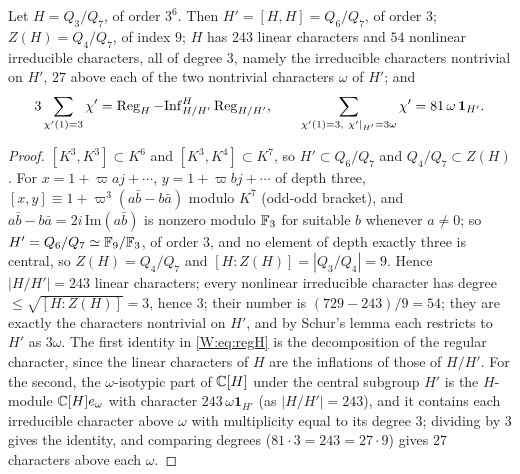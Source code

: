 \begin{lemma}[The group $H=Q_3/Q_7$]\label{W:lem:Hstructure}
Let $H=Q_3/Q_7$, of order $3^6$.  Then $H'=[H,H]=Q_6/Q_7$, of order $3$;
$Z(H)=Q_4/Q_7$, of index $9$; $H$ has $243$ linear characters and $54$
nonlinear irreducible characters, all of degree $3$, namely the
irreducible characters nontrivial on $H'$, $27$ above each of the two
nontrivial characters $\omega$ of $H'$; and
\begin{equation}\label{W:eq:regH}
 3\sum_{\chi'(1)=3}\chi'=\operatorname{Reg}_H-\mathrm{Inf}_{H/H'}^{H}\operatorname{Reg}_{H/H'},\qquad
 \sum_{\chi'(1)=3,\ \chi'|_{H'}=3\omega}\chi'=81\,\omega\,\mathbf 1_{H'} .
\end{equation}
\end{lemma}
\begin{proof}
$[K^3,K^3]\subset K^6$ and $[K^3,K^4]\subset K^7$, so $H'\subset Q_6/Q_7$
and $Q_4/Q_7\subset Z(H)$.  For $x=1+\varpi aj+\cdots$, $y=1+\varpi bj+\cdots$
of depth three, $[x,y]\equiv1+\varpi^3(a\bar b-b\bar a)$ modulo $K^7$
(odd-odd bracket), and $a\bar b-b\bar a=2i\,\mathrm{Im}(a\bar b)$ is
nonzero modulo $\mathbb F_3$ for suitable $b$ whenever $a\ne0$; so
$H'=Q_6/Q_7\simeq\mathbb F_9/\mathbb F_3$, of order $3$, and no element of depth
exactly three is central, so $Z(H)=Q_4/Q_7$ and $[H:Z(H)]=|Q_3/Q_4|=9$.
Hence $|H/H'|=243$ linear characters; every nonlinear irreducible
character has degree $\le\sqrt{[H:Z(H)]}=3$, hence $3$; their number is
$(729-243)/9=54$; they are exactly the characters nontrivial on $H'$,
and by Schur's lemma each restricts to $H'$ as $3\omega$.  The first
identity in \eqref{W:eq:regH} is the decomposition of the regular
character, since the linear characters of $H$ are the inflations of
those of $H/H'$.  For the second, the $\omega$-isotypic part of $\mathbb C[H]$
under the central subgroup $H'$ is the $H$-module $\mathbb C[H]e_\omega$ with
character $243\,\omega\mathbf 1_{H'}$ (as $|H/H'|=243$), and it contains
each irreducible character above $\omega$ with multiplicity equal to its
degree $3$; dividing by $3$ gives the identity, and comparing degrees
($81\cdot3=243=27\cdot9$) gives $27$ characters above each $\omega$.
\end{proof}

